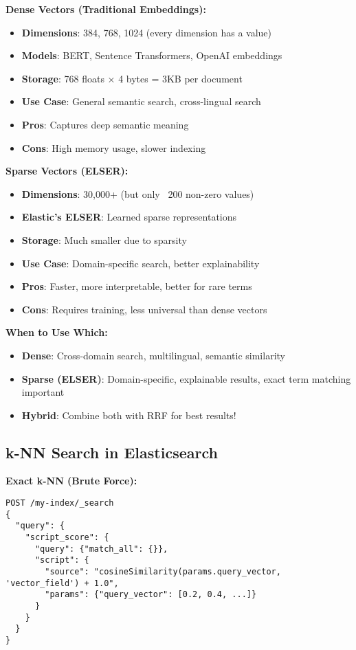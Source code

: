 \documentclass[10pt]{article}
\begin{document}
\textbf{Dense Vectors (Traditional Embeddings):}
\begin{itemize}
\item \textbf{Dimensions}: 384, 768, 1024 (every dimension has a value)
\item \textbf{Models}: BERT, Sentence Transformers, OpenAI embeddings
\item \textbf{Storage}: 768 floats × 4 bytes = 3KB per document
\item \textbf{Use Case}: General semantic search, cross-lingual search
\item \textbf{Pros}: Captures deep semantic meaning
\item \textbf{Cons}: High memory usage, slower indexing
\end{itemize}

\textbf{Sparse Vectors (ELSER):}
\begin{itemize}
\item \textbf{Dimensions}: 30,000+ (but only ~200 non-zero values)
\item \textbf{Elastic's ELSER}: Learned sparse representations
\item \textbf{Storage}: Much smaller due to sparsity
\item \textbf{Use Case}: Domain-specific search, better explainability
\item \textbf{Pros}: Faster, more interpretable, better for rare terms
\item \textbf{Cons}: Requires training, less universal than dense vectors
\end{itemize}

\textbf{When to Use Which:}
\begin{itemize}
\item \textbf{Dense}: Cross-domain search, multilingual, semantic similarity
\item \textbf{Sparse (ELSER)}: Domain-specific, explainable results, exact term matching important
\item \textbf{Hybrid}: Combine both with RRF for best results!
\end{itemize}

\subsection{k-NN Search in Elasticsearch}

\textbf{Exact k-NN (Brute Force):}
\begin{lstlisting}
POST /my-index/_search
{
  "query": {
    "script_score": {
      "query": {"match_all": {}},
      "script": {
        "source": "cosineSimilarity(params.query_vector, 'vector_field') + 1.0",
        "params": {"query_vector": [0.2, 0.4, ...]}
      }
    }
  }
}
\end{lstlisting}
\end{document}

